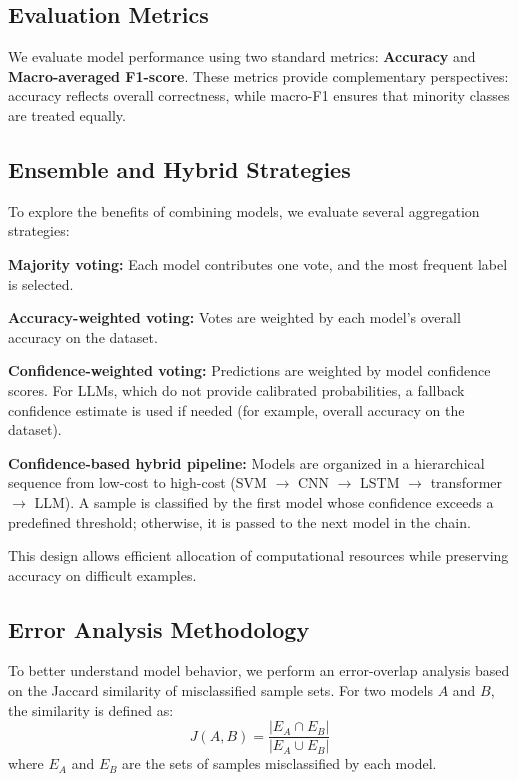 \documentclass[conference]{IEEEtran}
\begin{document}
\subsection{Evaluation Metrics}

We evaluate model performance using two standard metrics: \textbf{Accuracy} and \textbf{Macro-averaged F1-score}. These metrics provide complementary perspectives: accuracy reflects overall correctness, while macro-F1 ensures that minority classes are treated equally.

\subsection{Ensemble and Hybrid Strategies}

To explore the benefits of combining models, we evaluate several aggregation strategies:

\textbf{Majority voting:}
Each model contributes one vote, and the most frequent label is selected.

\textbf{Accuracy-weighted voting:}
Votes are weighted by each model's overall accuracy on the dataset.

\textbf{Confidence-weighted voting:}
Predictions are weighted by model confidence scores. For LLMs, which do not provide calibrated probabilities, a fallback confidence estimate is used if needed (for example, overall accuracy on the dataset).

\textbf{Confidence-based hybrid pipeline:}
Models are organized in a hierarchical sequence from low-cost to high-cost (SVM $\rightarrow$ CNN $\rightarrow$ LSTM $\rightarrow$ transformer $\rightarrow$ LLM). A sample is classified by the first model whose confidence exceeds a predefined threshold; otherwise, it is passed to the next model in the chain.

This design allows efficient allocation of computational resources while preserving accuracy on difficult examples.

\subsection{Error Analysis Methodology}

To better understand model behavior, we perform an error-overlap analysis based on the Jaccard similarity of misclassified sample sets. For two models $A$ and $B$, the similarity is defined as:
\[
J(A, B) = \frac{|E_A \cap E_B|}{|E_A \cup E_B|}
\]
where $E_A$ and $E_B$ are the sets of samples misclassified by each model.
\end{document}
